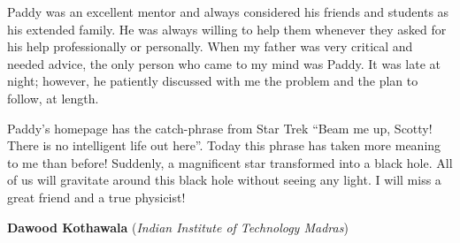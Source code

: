 \documentclass[prd, preprint, longbibliography, 12pt]{revtex4-2}
\begin{document}
Paddy was an excellent mentor and always considered his friends and students as his extended family. He was always  willing to help them whenever they asked for his help professionally or personally. When my father was very critical and needed advice, the only person who came to my mind was Paddy. It was late at night; however, he patiently discussed with me the problem and the plan to follow, at length. 


Paddy’s homepage has the catch-phrase from Star Trek “Beam me up, Scotty! There is no intelligent life out here”. Today this phrase has taken more meaning to me than before! Suddenly, a magnificent star transformed into a black hole. All of us will gravitate around this black hole without seeing any light. I will miss a great friend and a true physicist! 

\bigskip

\bigskip

\centerline{{\bf Dawood Kothawala} ({\it Indian Institute of Technology Madras})}
\medskip
{}
\end{document}
